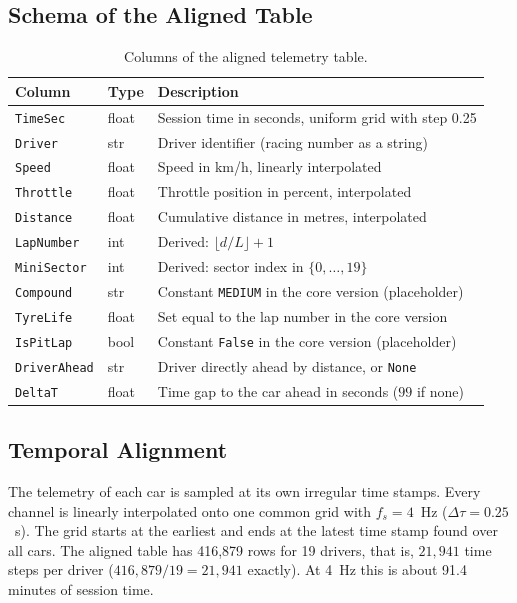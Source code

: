 \documentclass[11pt,a4paper]{article}
\begin{document}
\subsection{Schema of the Aligned Table}
\begin{table}[H]
\centering
\caption{Columns of the aligned telemetry table.}
\label{tab:schema}
\small
\begin{tabularx}{\linewidth}{@{}llX@{}}
\toprule
\textbf{Column} & \textbf{Type} & \textbf{Description} \\
\midrule
\texttt{TimeSec} & float & Session time in seconds, uniform grid with step 0.25 \\
\texttt{Driver} & str & Driver identifier (racing number as a string) \\
\texttt{Speed} & float & Speed in km/h, linearly interpolated \\
\texttt{Throttle} & float & Throttle position in percent, interpolated \\
\texttt{Distance} & float & Cumulative distance in metres, interpolated \\
\texttt{LapNumber} & int & Derived: $\lfloor d / L \rfloor + 1$ \\
\texttt{MiniSector} & int & Derived: sector index in $\{0,\dots,19\}$ \\
\texttt{Compound} & str & Constant \texttt{MEDIUM} in the core version (placeholder) \\
\texttt{TyreLife} & float & Set equal to the lap number in the core version \\
\texttt{IsPitLap} & bool & Constant \texttt{False} in the core version (placeholder) \\
\texttt{DriverAhead} & str & Driver directly ahead by distance, or \texttt{None} \\
\texttt{DeltaT} & float & Time gap to the car ahead in seconds ($99$ if none) \\
\bottomrule
\end{tabularx}
\end{table}

\subsection{Temporal Alignment}
The telemetry of each car is sampled at its own irregular time stamps. Every
channel is linearly interpolated onto one common grid with
$f_s = 4$~Hz ($\Delta\tau = 0.25$~s). The grid starts at the earliest and
ends at the latest time stamp found over all cars. The aligned table has
416{,}879 rows for 19 drivers, that is, $21{,}941$ time steps per driver
($416{,}879 / 19 = 21{,}941$ exactly). At 4~Hz this is about 91.4 minutes of
session time.
\end{document}
